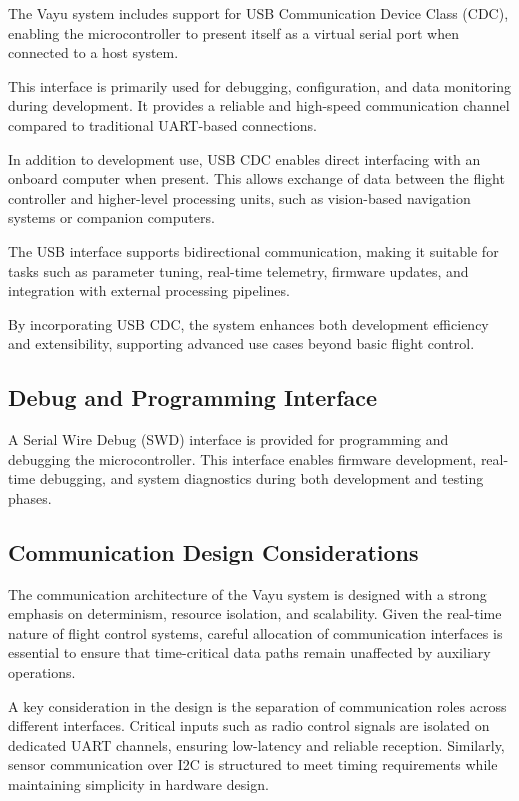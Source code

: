 The Vayu system includes support for USB Communication Device Class (CDC), enabling the microcontroller to present itself as a virtual serial port when connected to a host system.

This interface is primarily used for debugging, configuration, and data monitoring during development. It provides a reliable and high-speed communication channel compared to traditional UART-based connections.

In addition to development use, USB CDC enables direct interfacing with an onboard computer when present. This allows exchange of data between the flight controller and higher-level processing units, such as vision-based navigation systems or companion computers.

The USB interface supports bidirectional communication, making it suitable for tasks such as parameter tuning, real-time telemetry, firmware updates, and integration with external processing pipelines.

By incorporating USB CDC, the system enhances both development efficiency and extensibility, supporting advanced use cases beyond basic flight control.

\subsection{Debug and Programming Interface}

A Serial Wire Debug (SWD) interface is provided for programming and debugging the microcontroller. This interface enables firmware development, real-time debugging, and system diagnostics during both development and testing phases.

\subsection{Communication Design Considerations}

The communication architecture of the Vayu system is designed with a strong emphasis on determinism, resource isolation, and scalability. Given the real-time nature of flight control systems, careful allocation of communication interfaces is essential to ensure that time-critical data paths remain unaffected by auxiliary operations.

A key consideration in the design is the separation of communication roles across different interfaces. Critical inputs such as radio control signals are isolated on dedicated UART channels, ensuring low-latency and reliable reception. Similarly, sensor communication over I2C is structured to meet timing requirements while maintaining simplicity in hardware design.

